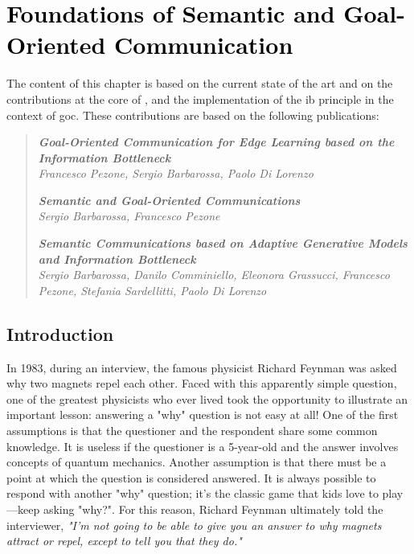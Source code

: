 \chapter{\textcolor{black}{Foundations of Semantic and Goal-Oriented Communication}}
\label{ch: SEMCOM}
\thispagestyle{plain}
The content of this chapter is based on the current state of the art and on the contributions at the core of ,  and the implementation of the \gls{ib} principle in the context of \gls{goc}. These contributions are based on the following publications:
\begin{quotation}
\noindent \textit{\textbf{\large Goal-Oriented Communication for Edge Learning based on the Information Bottleneck}}\\
\textit{Francesco Pezone, Sergio Barbarossa, Paolo Di Lorenzo}

\vspace{0.1cm}
\noindent \textit{\textbf{\large Semantic and Goal-Oriented Communications}}\\
\textit{Sergio Barbarossa, Francesco Pezone}

\vspace{0.1cm}

\noindent \textit{\textbf{\large Semantic Communications based on Adaptive Generative Models and Information Bottleneck}}\\
\textit{Sergio Barbarossa, Danilo Comminiello, Eleonora Grassucci, Francesco Pezone, Stefania Sardellitti, Paolo Di Lorenzo}
\end{quotation}

 

\section{Introduction}
In 1983, during an interview, the famous physicist Richard Feynman was asked why two magnets repel each other. Faced with this apparently simple question, one of the greatest physicists who ever lived took the opportunity to illustrate an important lesson: answering a "why" question is not easy at all! One of the first assumptions is that the questioner and the respondent share some common knowledge. It is useless if the questioner is a 5-year-old and the answer involves concepts of quantum mechanics. Another assumption is that there must be a point at which the question is considered answered. It is always possible to respond with another "why" question; it's the classic game that kids love to play—keep asking "why?". For this reason, Richard Feynman ultimately told the interviewer, \textit{"I'm not going to be able to give you an answer to why magnets attract or repel, except to tell you that they do."}\\

